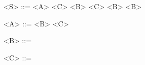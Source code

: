 \begin{grammarEx}
	<S> ::= <A> <C> <B>
	  <B>
	 
	
	<A> ::=  
	 <C>
	
	<B> ::= 
	\alt \textemptyword{}
	
	<C> ::= 
	\alt \textemptyword{}
\end{grammarEx}